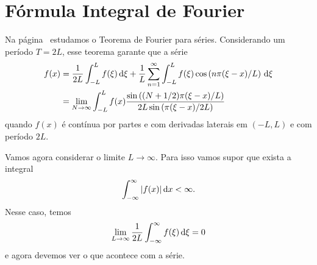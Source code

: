 \section{Fórmula Integral de Fourier}
Na página~\pageref{teo:fourier} estudamos o Teorema de Fourier para
séries. Considerando um período $T = 2L$, esse teorema garante que a
série
\begin{align*}
    f(x) &= \frac{1}{2L} \int_{-L}^L f(\xi) \, \mathrm{d}\xi + \frac{1}{L} \sum_{n =
    1}^\infty \int_{-L}^L f(\xi) \cos\left( n \pi (\xi - x) / L \right) \, \mathrm{d}\xi
    \\
    &= \lim_{N \to \infty} \int_{-L}^L f(x) \frac{\sin\left( (N + 1 / 2) \pi
    (\xi - x) / L \right)}{2 L \sin\left( \pi (\xi - x) / 2 L \right)}
\end{align*}
quando $f(x)$ é contínua por partes e com derivadas laterais em $(-L,
L)$ e com período $2L$.

Vamos agora considerar o limite $L \to \infty$. Para isso vamos supor que exista
a integral
\begin{align*}
    \int_{-\infty}^\infty |f(x)| \, \mathrm{d}x < \infty.
\end{align*}
Nesse caso, temos
\begin{align*}
    \lim_{L \to \infty} \frac{1}{2L} \int_{-\infty}^\infty f(\xi) \, \mathrm{d}\xi = 0
\end{align*}
e agora devemos ver o que acontece com a série.

